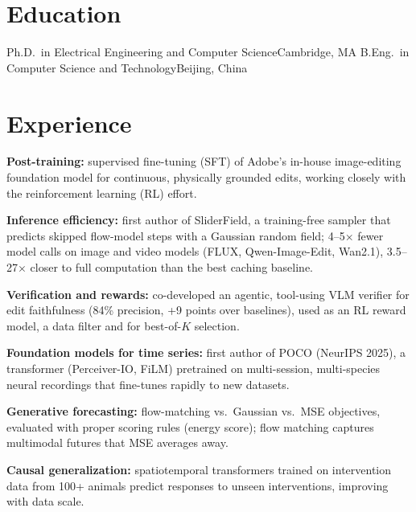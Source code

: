 \documentclass[resume]{clean_cv}
\author{Yu Duan}
\begin{document}
\maketitle
\resumecontact

\section{Education}
  {Ph.D.\ in Electrical Engineering and Computer Science}{Cambridge, MA}
\vspace{4pt}
  {B.Eng.\ in Computer Science and Technology}{Beijing, China}

\section{Experience}
\begin{bullets}
\item \textbf{Post-training:} supervised fine-tuning (SFT) of Adobe's in-house image-editing foundation model for continuous, physically grounded edits, working closely with the reinforcement learning (RL) effort.
\item \textbf{Inference efficiency:} first author of SliderField, a training-free sampler that predicts skipped flow-model steps with a Gaussian random field; 4--5$\times$ fewer model calls on image and video models (FLUX, Qwen-Image-Edit, Wan2.1), 3.5--27$\times$ closer to full computation than the best caching baseline.
\item \textbf{Verification and rewards:} co-developed an agentic, tool-using VLM verifier for edit faithfulness (84\% precision, +9 points over baselines), used as an RL reward model, a data filter and for best-of-$K$ selection.
\end{bullets}

\begin{bullets}
\item \textbf{Foundation models for time series:} first author of POCO (NeurIPS 2025), a transformer (Perceiver-IO, FiLM) pretrained on multi-session, multi-species neural recordings that fine-tunes rapidly to new datasets.
\item \textbf{Generative forecasting:} flow-matching vs.\ Gaussian vs.\ MSE objectives, evaluated with proper scoring rules (energy score); flow matching captures multimodal futures that MSE averages away.
\item \textbf{Causal generalization:} spatiotemporal transformers trained on intervention data from 100+ animals predict responses to unseen interventions, improving with data scale.
\end{bullets}
\end{document}
